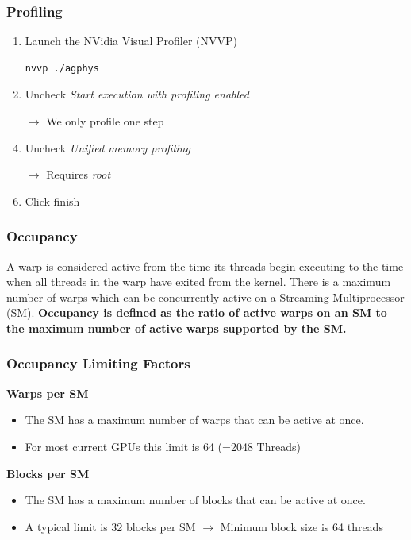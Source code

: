 \documentclass[aspectratio=169,handout]{beamer}
\begin{document}
\begin{frame}[fragile]
\frametitle{Profiling}

	\begin{minipage}{0.5\linewidth}
		\begin{enumerate}
			\item 		Launch the NVidia Visual Profiler (NVVP)
\begin{lstlisting}[language=bash]
nvvp ./agphys
\end{lstlisting}
			\item Uncheck \textit{Start execution with profiling enabled}
			\item[$\rightarrow$] We only profile one step
			\item Uncheck \textit{Unified memory profiling}
			\item[$\rightarrow$] Requires \textit{root}
			\item Click finish
		\end{enumerate}


\end{minipage}
\begin{minipage}{0.47\linewidth}

\end{minipage}
\end{frame}


\begin{frame}[fragile]
\frametitle{Occupancy}

	\begin{mdframed}[frametitle={CUDA Programming Guide}]
A warp is considered active from the time its threads begin executing to the time when all threads in the warp have exited from the kernel. There is a maximum number of warps which can be concurrently active on a Streaming Multiprocessor (SM). \textbf{Occupancy is defined as the ratio of active warps on an SM to the maximum number of active warps supported by the SM.}
\end{mdframed}
\end{frame}


\begin{frame}[fragile]
\frametitle{Occupancy Limiting Factors}
\textbf{Warps per SM}
\begin{itemize}
	\item The SM has a maximum number of warps that can be active at once. 
	\item For most current GPUs this limit is 64 (=2048 Threads)
\end{itemize}

\textbf{Blocks per SM}
\begin{itemize}
	\item The SM has a maximum number of blocks that can be active at once.
	\item A typical limit is 32 blocks per SM $\rightarrow$ Minimum block size is 64 threads
\end{itemize}		
\end{frame}
\end{document}
